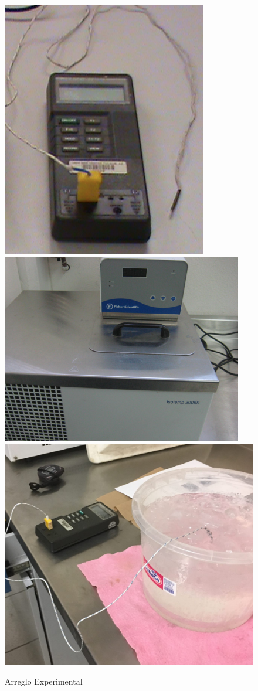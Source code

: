 \documentclass[12pt]{article}
\begin{document}
\begin{figure}[H]
\centering
\includegraphics[scale=0.35]{termopar.png}
\includegraphics[scale=0.35]{mezcla.png}
\includegraphics[scale=0.10]{arr.png}
\caption{Arreglo Experimental}
\end{figure}
\end{document}
